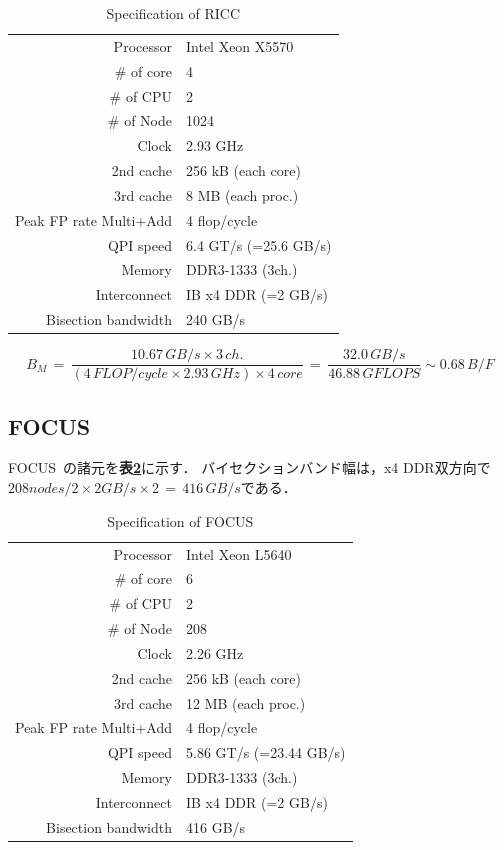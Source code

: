 \begin{table}[htdp]
\caption{Specification of RICC}
\small
\begin{center}
\begin{tabular}{rl}\toprule
Processor & Intel Xeon X5570\\
\# of core & 4\\
\# of CPU & 2\\
\# of Node & 1024\\
Clock & 2.93 GHz\\
2nd cache & 256 kB (each core)\\
3rd cache & 8 MB (each proc.)\\
Peak FP rate Multi+Add & 4 flop/cycle\\
QPI speed & 6.4 GT/s (=25.6 GB/s)\\
Memory & DDR3-1333 (3ch.)\\
Interconnect & IB x4 DDR (=2 GB/s)\\
Bisection bandwidth & 240 GB/s\\ \bottomrule
\end{tabular}
\end{center}
\label{tbl:ricc}
\end{table}


\begin{equation}
B_M \,=\, \frac{10.67\,GB/s \times 3\,ch.}{(4\,FLOP/cycle \times 2.93\,GHz) \times 4\,core} \,=\, \frac{32.0\,GB/s}{46.88\,GFLOPS} \sim 0.68\,B/F
\label{eq:B_M ricc}
\end{equation}

%
\subsection{FOCUS}
FOCUS~\cite{focus}の諸元を\textbf{表\ref{tbl:focus}}に示す．
バイセクションバンド幅は，x4 DDR双方向で$208nodes/2 \times 2GB/s \times 2\,=\,416\,GB/s$である．

\begin{table}[htdp]
\caption{Specification of FOCUS}
\small
\begin{center}
\begin{tabular}{rl}\toprule
Processor & Intel Xeon L5640\\
\# of core & 6\\
\# of CPU & 2\\
\# of Node & 208\\
Clock & 2.26 GHz\\
2nd cache & 256 kB (each core)\\
3rd cache & 12 MB (each proc.)\\
Peak FP rate Multi+Add & 4 flop/cycle\\
QPI speed & 5.86 GT/s (=23.44 GB/s)\\
Memory & DDR3-1333 (3ch.)\\
Interconnect & IB x4 DDR (=2 GB/s)\\
Bisection bandwidth & 416 GB/s\\ \bottomrule
\end{tabular}
\end{center}
\label{tbl:focus}
\end{table}

